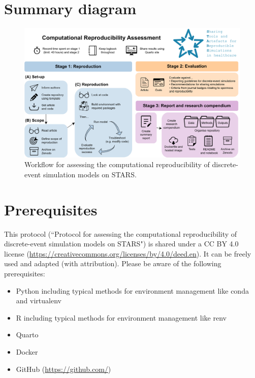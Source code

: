 \section{Summary diagram}

\begin{figure}[!htb]
    \includegraphics[width=1\linewidth]{images/stars_wp1_workflow.png}
    \caption{Workflow for assessing the computational reproducibility of discrete-event simulation models on STARS.}
    \label{fig:summary}
\end{figure}

\vspace{1cm}
\section{Prerequisites}

This protocol (``Protocol for assessing the computational reproducibility of discrete-event simulation models on STARS") is shared under a CC BY 4.0 license (\url{https://creativecommons.org/licenses/by/4.0/deed.en}). It can be freely used and adapted (with attribution). Please be aware of the following prerequisites:

\begin{itemize}
    \item Python\autocite{python_core_team_python_2024} including typical methods for environment management like conda\autocite{conda_contributors_conda_2023} and virtualenv\autocite{python_packaging_authority_virtualenv_2023}
    \item R\autocite{r_core_team_r_2024} including typical methods for environment management like renv\autocite{ushey_renv_2024}
    \item Quarto\autocite{allaire_quarto_2024}
    \item Docker\autocite{merkel_docker_2014}
    \item GitHub (\url{https://github.com/})
\end{itemize}

